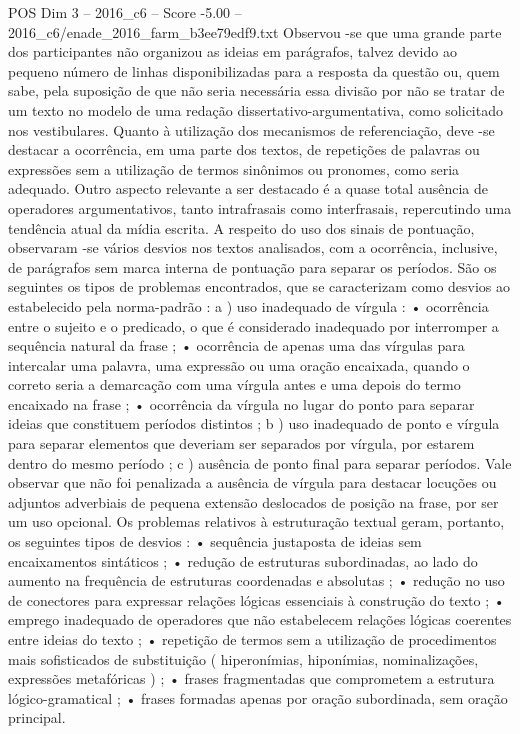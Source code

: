 \begin{textsample}{POS Dim 3 – 2016\_c6 – Score -5.00 – 2016\_c6/enade\_2016\_farm\_b3ee79edf9.txt}
Observou -se que uma grande parte dos participantes não organizou as ideias em parágrafos, talvez devido ao pequeno número de linhas disponibilizadas para a resposta da questão ou, quem sabe, pela suposição de que não seria necessária essa divisão por não se tratar de um texto no modelo de uma redação dissertativo-argumentativa, como solicitado nos vestibulares.
Quanto à utilização dos mecanismos de referenciação, deve -se destacar a ocorrência, em uma parte dos textos, de repetições de palavras ou expressões sem a utilização de termos sinônimos ou pronomes, como seria adequado.
Outro aspecto relevante a ser destacado é a quase total ausência de operadores argumentativos, tanto intrafrasais como interfrasais, repercutindo uma tendência atual da mídia escrita.
A respeito do uso dos sinais de pontuação, observaram -se vários desvios nos textos analisados, com a ocorrência, inclusive, de parágrafos sem marca interna de pontuação para separar os períodos.
São os seguintes os tipos de problemas encontrados, que se caracterizam como desvios ao estabelecido pela norma-padrão : a ) uso inadequado de vírgula : • ocorrência entre o sujeito e o predicado, o que é considerado inadequado por interromper a sequência natural da frase ; • ocorrência de apenas uma das vírgulas para intercalar uma palavra, uma expressão ou uma oração encaixada, quando o correto seria a demarcação com uma vírgula antes e uma depois do termo encaixado na frase ; • ocorrência da vírgula no lugar do ponto para separar ideias que constituem períodos distintos ; b ) uso inadequado de ponto e vírgula para separar elementos que deveriam ser separados por vírgula, por estarem dentro do mesmo período ; c ) ausência de ponto final para separar períodos.
Vale observar que não foi penalizada a ausência de vírgula para destacar locuções ou adjuntos adverbiais de pequena extensão deslocados de posição na frase, por ser um uso opcional.
Os problemas relativos à estruturação textual geram, portanto, os seguintes tipos de desvios : • sequência justaposta de ideias sem encaixamentos sintáticos ; • redução de estruturas subordinadas, ao lado do aumento na frequência de estruturas coordenadas e absolutas ; • redução no uso de conectores para expressar relações lógicas essenciais à construção do texto ; • emprego inadequado de operadores que não estabelecem relações lógicas coerentes entre ideias do texto ; • repetição de termos sem a utilização de procedimentos mais sofisticados de substituição ( hiperonímias, hiponímias, nominalizações, expressões metafóricas ) ; • frases fragmentadas que comprometem a estrutura lógico-gramatical ; • frases formadas apenas por oração subordinada, sem oração principal.

\end{textsample}
